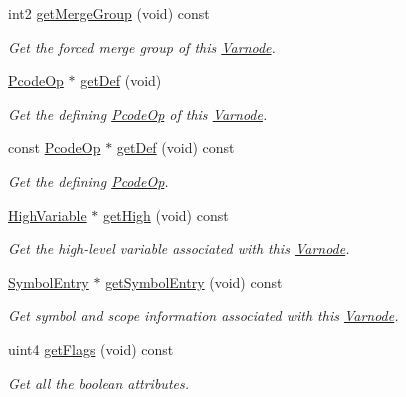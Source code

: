 \begin{DoxyCompactItemize}
int2 \mbox{\hyperlink{class_varnode_a8d3e88632d8116fab1c6958feeeec593}{get\+Merge\+Group}} (void) const
\begin{DoxyCompactList}\small\item\em Get the {\itshape forced} {\itshape merge} group of this \mbox{\hyperlink{class_varnode}{Varnode}}. \end{DoxyCompactList}\item 
\mbox{\hyperlink{class_pcode_op}{Pcode\+Op}} $\ast$ \mbox{\hyperlink{class_varnode_a8f227a762a3baec9ffa6962c5298e3a3}{get\+Def}} (void)
\begin{DoxyCompactList}\small\item\em Get the defining \mbox{\hyperlink{class_pcode_op}{Pcode\+Op}} of this \mbox{\hyperlink{class_varnode}{Varnode}}. \end{DoxyCompactList}\item 
const \mbox{\hyperlink{class_pcode_op}{Pcode\+Op}} $\ast$ \mbox{\hyperlink{class_varnode_ae84dc23e1dd22fde882aca43d22ec681}{get\+Def}} (void) const
\begin{DoxyCompactList}\small\item\em Get the defining \mbox{\hyperlink{class_pcode_op}{Pcode\+Op}}. \end{DoxyCompactList}\item 
\mbox{\hyperlink{class_high_variable}{High\+Variable}} $\ast$ \mbox{\hyperlink{class_varnode_a99192dea44cf05e3c619f65cbde949c7}{get\+High}} (void) const
\begin{DoxyCompactList}\small\item\em Get the high-\/level variable associated with this \mbox{\hyperlink{class_varnode}{Varnode}}. \end{DoxyCompactList}\item 
\mbox{\hyperlink{class_symbol_entry}{Symbol\+Entry}} $\ast$ \mbox{\hyperlink{class_varnode_a47ebcd6a380ad9322fbfbf083650b8f8}{get\+Symbol\+Entry}} (void) const
\begin{DoxyCompactList}\small\item\em Get symbol and scope information associated with this \mbox{\hyperlink{class_varnode}{Varnode}}. \end{DoxyCompactList}\item 
uint4 \mbox{\hyperlink{class_varnode_a12481445603bc8b49887c5d6d41e8ae6}{get\+Flags}} (void) const
\begin{DoxyCompactList}\small\item\em Get all the boolean attributes. \end{DoxyCompactList}\item 

\end{DoxyCompactItemize}

